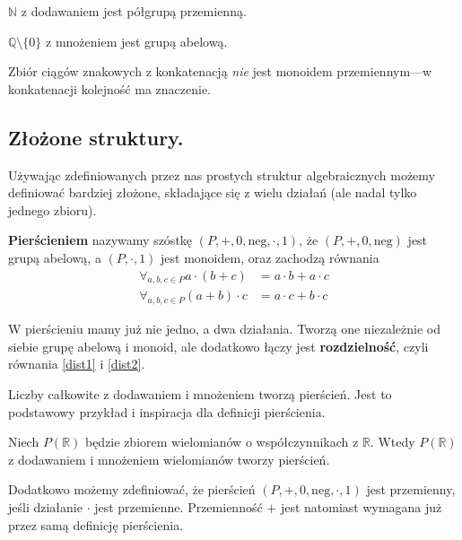 \begin{example}
	$\mathbb{N}$ z dodawaniem jest półgrupą przemienną.
\end{example}

\begin{example}
	$\mathbb{Q}\setminus\{0\}$ z mnożeniem jest grupą abelową.
\end{example}

\begin{example}
	Zbiór ciągów znakowych z konkatenacją \textit{nie} jest monoidem przemiennym---w konkatenacji kolejność ma znaczenie.
\end{example}

\subsection{Złożone struktury.}
Używając zdefiniowanych przez nas prostych struktur algebraicznych możemy definiować bardziej złożone,
	składające się z wielu działań (ale nadal tylko jednego zbioru).

\begin{definition}
	\textbf{Pierścieniem} nazywamy szóstkę $(P, +, 0, \mathrm{neg}, \cdot, 1)$,
		że $(P, +, 0, \mathrm{neg})$ jest grupą abelową,
		a $(P, \cdot, 1)$ jest monoidem,
		oraz zachodzą równania
		\begin{align}
			\label{dist1}\forall_{a, b, c \in P} a \cdot (b + c) &= a \cdot b + a \cdot c \\
			\label{dist2}\forall_{a, b, c \in P} (a + b) \cdot c &= a \cdot c + b \cdot c
		\end{align}
\end{definition}

W pierścieniu mamy już nie jedno,
	a dwa działania.
Tworzą one niezależnie od siebie grupę abelową i monoid,
	ale dodatkowo łączy jest \textbf{rozdzielność},
	czyli równania \eqref{dist1} i \eqref{dist2}.

\begin{example}
	Liczby całkowite z dodawaniem i mnożeniem tworzą pierścień.
	Jest to podstawowy przykład i inspiracja dla definicji pierścienia.
\end{example}

\begin{example}
	Niech $P(\mathbb{R})$ będzie zbiorem wielomianów o współczynnikach z $\mathbb{R}$.
	Wtedy $P(\mathbb{R})$ z dodawaniem i mnożeniem wielomianów tworzy pierścień.
\end{example}

Dodatkowo możemy zdefiniować,
	że pierścień $(P, +, 0, \mathrm{neg}, \cdot, 1)$ jest przemienny,
	jeśli działanie $\cdot$ jest przemienne.
Przemienność $+$ jest natomiast wymagana już przez samą definicję pierścienia.


